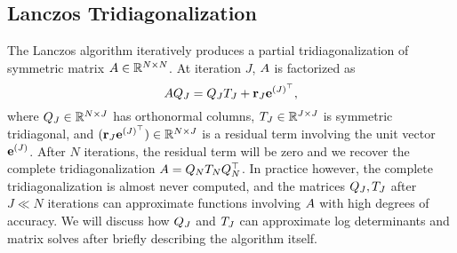 

\subsection{Lanczos Tridiagonalization}
\label{sec:lanczos}

The Lanczos algorithm \cite{lanczos1950iteration} iteratively produces a partial tridiagonalization of symmetric matrix $A \in \mathbb{R}^{N \times N}$.
At iteration $J$, $A$ is factorized as
%
\begin{equation}
  A Q_J = Q_J T_J + \mathbf{r}_J \mathbf{e}^{(J)^\top},
  \label{eqn:lanczos}
\end{equation}
%
where $Q_J \in \mathbb{R}^{N \times J}$ has orthonormal columns, $T_J \in \mathbb{R}^{J \times J}$ is symmetric tridiagonal, and $(\mathbf{r}_J \mathbf{e}^{(J)^\top}) \in \mathbb{R}^{N \times J}$ is a residual term involving the unit vector $\mathbf{e}^{(J)}$.
After $N$ iterations, the residual term will be zero and we recover the complete tridiagonalization $A = Q_N T_N Q^\top_N$.
In practice however, the complete tridiagonalization is almost never computed, and the matrices $Q_J, T_J$ after $J \ll N$ iterations can approximate functions involving $A$ with high degrees of accuracy.
We will discuss how $Q_J$ and $T_J$ can approximate log determinants and matrix solves after briefly describing the algorithm itself.

